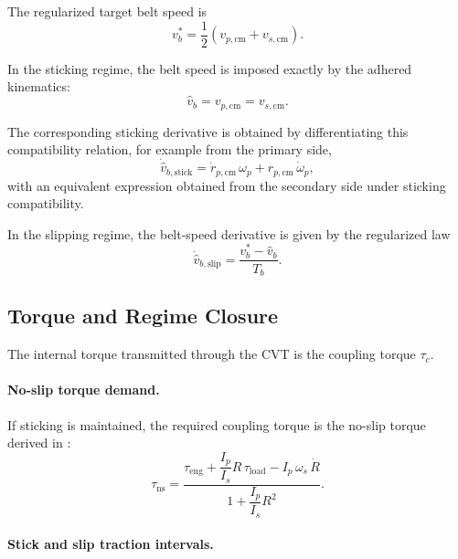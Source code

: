 \documentclass[11pt]{article}
\numberwithin{equation}{section}
\begin{document}
The regularized target belt speed is
\begin{equation}
v_b^\ast
=
\frac{1}{2}\left(v_{p,\mathrm{cm}}+v_{s,\mathrm{cm}}\right).
\label{eq:vb_target_complete}
\end{equation}

In the sticking regime, the belt speed is imposed exactly by the adhered
kinematics:
\begin{equation}
\hat v_b = v_{p,\mathrm{cm}} = v_{s,\mathrm{cm}}.
\label{eq:vb_stick_complete}
\end{equation}

The corresponding sticking derivative is obtained by differentiating this
compatibility relation, for example from the primary side,
\begin{equation}
\dot{\hat v}_{b,\mathrm{stick}}
=
\dot r_{p,\mathrm{cm}}\,\omega_p
+
r_{p,\mathrm{cm}}\,\dot\omega_p,
\label{eq:vb_dot_stick_complete}
\end{equation}
with an equivalent expression obtained from the secondary side under sticking
compatibility.

In the slipping regime, the belt-speed derivative is given by the regularized
law
\begin{equation}
\dot{\hat v}_{b,\mathrm{slip}}
=
\frac{v_b^\ast-\hat v_b}{T_b}.
\label{eq:vb_dot_slip_complete}
\end{equation}

\subsection{Torque and Regime Closure}

The internal torque transmitted through the CVT is the coupling torque
\(\tau_c\).

\paragraph{No-slip torque demand.}

If sticking is maintained, the required coupling torque is the no-slip torque
derived in :
\begin{equation}
\tau_{\mathrm{ns}}
=
\frac{
\tau_{\mathrm{eng}}
+
\dfrac{I_p}{I_s}R\,\tau_{\mathrm{load}}
-
I_p\,\omega_s\,\dot R
}{
1+\dfrac{I_p}{I_s}R^2
}.
\label{eq:tau_ns_complete}
\end{equation}

\paragraph{Stick and slip traction intervals.}
\end{document}
